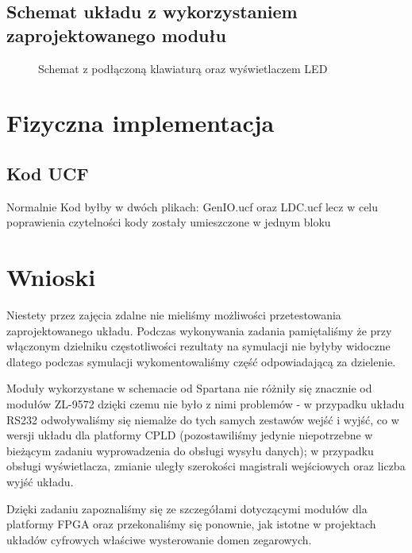 \documentclass[a4paper,12pt]{extarticle}  %
\begin{document}
 \subsection{Schemat układu z wykorzystaniem zaprojektowanego modułu}
 \begin{figure}[H]
	 \centering
	 \caption{Schemat z podłączoną klawiaturą oraz wyświetlaczem LED}
  \end{figure}
\section{Fizyczna implementacja}
\subsection{Kod UCF}
Normalnie Kod byłby w dwóch plikach:
GenIO.ucf oraz LDC.ucf lecz w celu poprawienia czytelności kody zostały umieszczone w jednym bloku 


\section{Wnioski}
Niestety przez zajęcia zdalne nie mieliśmy możliwości przetestowania zaprojektowanego układu.
Podczas wykonywania zadania pamiętaliśmy że przy włączonym dzielniku częstotliwości rezultaty na symulacji nie byłyby widoczne dlatego 
podczas symulacji wykomentowaliśmy część odpowiadającą za dzielenie.

Moduły wykorzystane w schemacie od Spartana nie różniły się znacznie od modułów ZL-9572 dzięki czemu nie było z nimi problemów - w przypadku układu RS232 odwoływaliśmy się niemalże do tych samych zestawów wejść i wyjść, co w wersji układu dla platformy CPLD (pozostawiliśmy jedynie niepotrzebne w bieżącym zadaniu wyprowadzenia do obsługi wysyłu danych); w przypadku obsługi wyświetlacza, zmianie uległy szerokości magistrali wejściowych oraz liczba wyjść układu.  

Dzięki zadaniu zapoznaliśmy się ze szczegółami dotyczącymi modułów dla platformy FPGA oraz przekonaliśmy się ponownie, jak istotne w projektach układów cyfrowych właściwe wysterowanie domen zegarowych.
\end{document}
